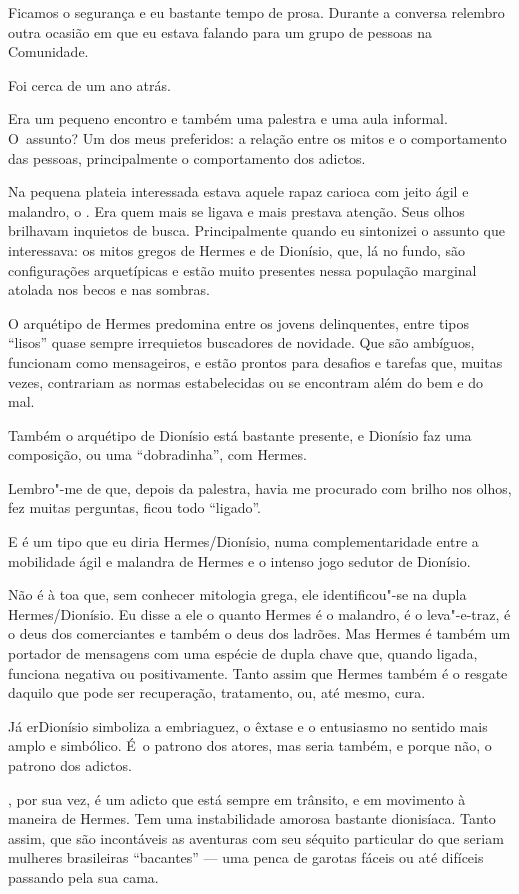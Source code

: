 Ficamos o segurança e eu bastante tempo de prosa. Durante a conversa
relembro outra ocasião em que eu estava falando para um grupo de pessoas
na Comunidade.

Foi cerca de um ano atrás.

Era um pequeno encontro e também uma palestra e uma aula informal. O~assunto? Um dos meus preferidos: a relação entre os mitos e o
comportamento das pessoas, principalmente o comportamento dos adictos.

Na pequena plateia interessada estava aquele rapaz carioca com jeito
ágil e malandro, o . Era quem mais se ligava e mais prestava atenção.
Seus olhos brilhavam inquietos de busca. Principalmente quando eu
sintonizei o assunto que interessava: os mitos gregos de Hermes e de
Dionísio, que, lá no fundo, são configurações arquetípicas e estão muito
presentes nessa população marginal atolada nos becos e nas sombras.

O arquétipo de Hermes predomina entre os jovens delinquentes, entre
tipos ``lisos'' quase sempre irrequietos buscadores de novidade. Que são
ambíguos, funcionam como mensageiros, e estão prontos para desafios e
tarefas que, muitas vezes, contrariam as normas estabelecidas ou se
encontram além do bem e do mal.

Também o arquétipo de Dionísio está bastante presente, e Dionísio faz
uma composição, ou uma ``dobradinha'', com Hermes.

Lembro"-me de que, depois da palestra,  havia me procurado com brilho
nos olhos, fez muitas perguntas, ficou todo ``ligado''.

E  é um tipo que eu diria Hermes/Dionísio, numa complementaridade
entre a mobilidade ágil e malandra de Hermes e o intenso jogo sedutor de
Dionísio.

Não é à toa que, sem conhecer mitologia grega, ele identificou"-se na
dupla Hermes/Dionísio. Eu disse a ele o quanto Hermes é o malandro, é o
leva"-e-traz, é o deus dos comerciantes e também o deus dos ladrões. Mas
Hermes é também um portador de mensagens com uma espécie de dupla chave
que, quando ligada, funciona negativa ou positivamente. Tanto assim que
Hermes também é o resgate daquilo que pode ser recuperação, tratamento,
ou, até mesmo, cura.

Já erDionísio simboliza a embriaguez, o êxtase e o entusiasmo no
sentido mais amplo e simbólico. É~o patrono dos atores, mas seria
também, e porque não, o patrono dos adictos.

, por sua vez, é um adicto que está sempre em trânsito, e em movimento
à maneira de Hermes. Tem uma instabilidade amorosa bastante dionisíaca.
Tanto assim, que são incontáveis as aventuras com seu séquito particular
do que seriam mulheres brasileiras ``bacantes'' --- uma penca de garotas
fáceis ou até difíceis passando pela sua cama.

